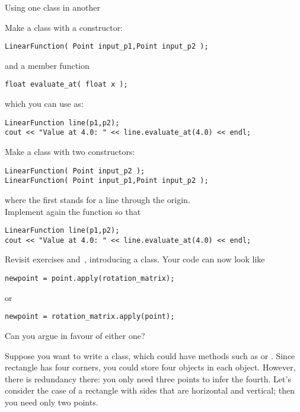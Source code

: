  {Using one class in another}
\label{sec:FuncHasPoint}
\label{sec:poly-rectangle}


\begin{exercise}
  \label{ex:geom:line}
  Make a class  with a constructor:
\begin{lstlisting}
LinearFunction( Point input_p1,Point input_p2 );
\end{lstlisting}
  and a member function
\begin{lstlisting}
float evaluate_at( float x );
\end{lstlisting}
  which you can use as:
\begin{lstlisting}
LinearFunction line(p1,p2);
cout << "Value at 4.0: " << line.evaluate_at(4.0) << endl;
\end{lstlisting}
\end{exercise}

\begin{exercise}
  \label{ex:geom:line2}
  Make a class  with two constructors:
\begin{lstlisting}
LinearFunction( Point input_p2 );
LinearFunction( Point input_p1,Point input_p2 );
\end{lstlisting}
where the first stands for a line through the origin.\\
Implement again the  function so that
\begin{lstlisting}
LinearFunction line(p1,p2);
cout << "Value at 4.0: " << line.evaluate_at(4.0) << endl;
\end{lstlisting}
\end{exercise}

\begin{exercise}
  \label{ex:pointrotate-matrix}
  Revisit exercises 
  and~, introducing a  class. Your
  code can now look like
\begin{lstlisting}
newpoint = point.apply(rotation_matrix);
\end{lstlisting}
  or
\begin{lstlisting}
newpoint = rotation_matrix.apply(point);
\end{lstlisting}
  Can you argue in favour of either one?
\end{exercise}

Suppose you want to write a  class, which could have methods such as
 or .
Since rectangle has four corners, you could store four 
objects in each  object. However, there is redundancy
there: you only need three points to infer the fourth. Let's consider
the case of a rectangle with sides that are horizontal and vertical;
then you need only two points.

